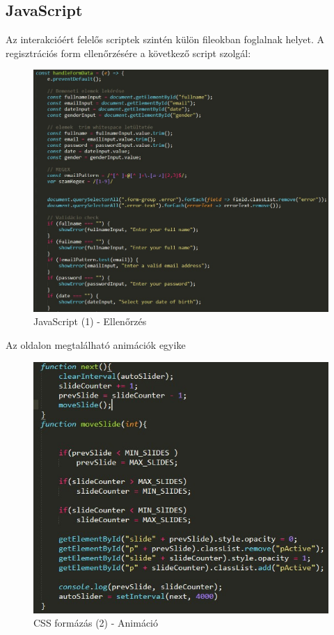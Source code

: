 \documentclass[12pt, titlepage]{article}
\begin{document}
\subsection{JavaScript}
Az interakcióért felelős scriptek szintén külön fileokban foglalnak helyet.
A regisztrációs form ellenőrzésére a következő script szolgál:
\begin{figure}[!h]
	\centering
	\includegraphics[width=\linewidth]{images/javascript/1.jpg}
	\caption{JavaScript (1) - Ellenőrzés}
\end{figure}

\pagebreak
Az oldalon megtalálható animációk egyike
\begin{figure}[!h]
	\centering
	\includegraphics[width=\linewidth]{images/javascript/2.jpg}
	\caption{CSS formázás (2) - Animáció}
\end{figure}
\end{document}
